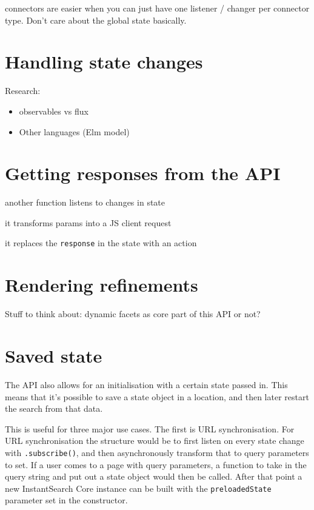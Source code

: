 connectors are easier when you can just have one listener / changer per connector type. Don't care about the global state basically.


\section{Handling state changes} %
\label{sec:handling_state_changes}

Research:

\begin{itemize}
  \item observables vs flux
  \item Other languages (Elm model)\cite{csstricks-elm}
\end{itemize}


\section{Getting responses from the API} %
\label{sec:getting_responses_from_the_api}

another function listens to changes in state

it transforms params into a JS client request

it replaces the {\tt response} in the state with an action


\section{Rendering refinements} %
\label{sec:rendering_refinements}

Stuff to think about: dynamic facets as core part of this API or not?


\section{Saved state} %
\label{sec:saved_state}

The API also allows for an initialisation with a certain state passed in. This means that it's possible to save a state object in a location, and then later restart the search from that data. 

This is useful for three major use cases. The first is URL synchronisation. For URL synchronisation the structure would be to first listen on every state change with {\tt .subscribe()}, and then asynchronously transform that to query parameters to set. If a user comes to a page with query parameters, a function to take in the query string and put out a state object would then be called. After that point a new InstantSearch Core instance can be built with the {\tt preloadedState} parameter set in the constructor.

